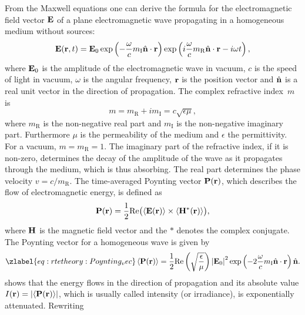  From the Maxwell equations one can derive the formula for the
electromagnetic field vector $\mathbf{E}$ of a plane electromagnetic
wave propagating in a homogeneous medium without sources:
\begin{equation}
  \mathbf{E}(\mathbf{r}, t) =
  \mathbf{E}_0
  \exp\left(-\frac{\omega}{c} m_{\mathrm{I}} \hat{{\bf n}} \cdot \mathbf{r}\right)
  \exp\left(i \frac{\omega}{c} m_{\mathrm{R}} \hat{{\bf n}} \cdot \mathbf{r}  - i \omega t \right),
\end{equation}
where $\mathbf{E}_0$ is the amplitude of the electromagnetic wave in
vacuum, $c$ is the speed of light in vacuum, $\omega$ is the angular
frequency, $\mathbf{r}$ is the position vector and $\hat{{\bf n}}$
is a real unit vector in the direction of propagation. The complex
refractive index~$m$ is
\begin{equation}
  m = m_{\mathrm{R}}+ i m_{\mathrm{I}} = c \sqrt{\epsilon \mu},
\end{equation}
where $m_{\mathrm{R}}$ is the non-negative real part and $m_{\mathrm{I}}$ is the non-negative imaginary part. Furthermore $\mu$ is the
permeability of the medium and $\epsilon$ the permittivity.  For a
vacuum, $m = m_{\mathrm{R}} = 1$.  The imaginary part of the refractive
index, if it is non-zero, determines the decay of the amplitude of the
wave as it propagates through the medium, which is thus absorbing.
The real part determines the phase velocity $v = c/m_{\mathrm{R}}$.
The time-averaged Poynting vector $\mathbf{P}(\mathbf{r})$, which describes the
flow of electromagnetic energy, is defined as
\begin{equation}
   \mathbf{P}(\mathbf{r}) =
     \frac{1}{2} \mathrm{Re} \bigl(\left\langle \mathbf{E}(\mathbf{r}) \right\rangle \times
     \left\langle \mathbf{H}^*(\mathbf{r}) \right\rangle\bigr),
\end{equation}
where $\mathbf{H}$ is the magnetic field vector and the $*$ denotes the
complex conjugate. The Poynting vector for a homogeneous wave is given
by
\begin{equation}
\zlabel{eq:rtetheory:Poynting_vec}
  \EnsAvr{\VctStl{P}(\VctStl{r})} =
   \frac{1}{2}\Re \left( \sqrt{\frac{\epsilon}{\mu}} \right)
   \Abs{\VctStl{E}_0}^2
   \exp\left(-2\frac{\omega}{c} m_{\mathrm{I}} \hat{\PDir} \cdot
     \VctStl{r}\right) \hat{\PDir}.
\end{equation}
 shows that the energy flows in the
direction of propagation and its absolute value $I(\mathbf{r}) =
\left| \left\langle \mathbf{P}(\mathbf{r}) \right\rangle \right| $, which is usually called
intensity (or irradiance), is exponentially attenuated. Rewriting
